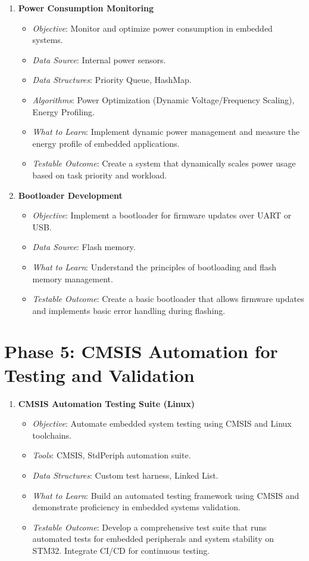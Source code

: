 \documentclass{article}
\begin{document}
\begin{enumerate}[label=\arabic*.]
    \item \textbf{Power Consumption Monitoring}
    \begin{itemize}
        \item \textit{Objective}: Monitor and optimize power consumption in embedded systems.
        \item \textit{Data Source}: Internal power sensors.
        \item \textit{Data Structures}: Priority Queue, HashMap.
        \item \textit{Algorithms}: Power Optimization (Dynamic Voltage/Frequency Scaling), Energy Profiling.
        \item \textit{What to Learn}: Implement dynamic power management and measure the energy profile of embedded applications.
        \item \textit{Testable Outcome}: Create a system that dynamically scales power usage based on task priority and workload.
    \end{itemize}
    
    \item \textbf{Bootloader Development}
    \begin{itemize}
        \item \textit{Objective}: Implement a bootloader for firmware updates over UART or USB.
        \item \textit{Data Source}: Flash memory.
        \item \textit{What to Learn}: Understand the principles of bootloading and flash memory management.
        \item \textit{Testable Outcome}: Create a basic bootloader that allows firmware updates and implements basic error handling during flashing.
    \end{itemize}
\end{enumerate}

\section{Phase 5: CMSIS Automation for Testing and Validation}
\begin{enumerate}[label=\arabic*.]
    \item \textbf{CMSIS Automation Testing Suite (Linux)}
    \begin{itemize}
        \item \textit{Objective}: Automate embedded system testing using CMSIS and Linux toolchains.
        \item \textit{Tools}: CMSIS, StdPeriph automation suite.
        \item \textit{Data Structures}: Custom test harness, Linked List.
        \item \textit{What to Learn}: Build an automated testing framework using CMSIS and demonstrate proficiency in embedded systems validation.
        \item \textit{Testable Outcome}: Develop a comprehensive test suite that runs automated tests for embedded peripherals and system stability on STM32. Integrate CI/CD for continuous testing.
    \end{itemize}
\end{enumerate}
\end{document}
